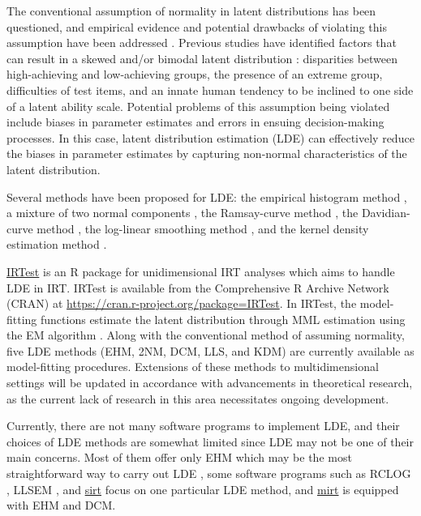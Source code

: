 The conventional assumption of normality in latent distributions has
been questioned, and empirical evidence and potential drawbacks of
violating this assumption have been addressed
\citep{Dudley-Marling:2020, Li:2022, Mislevy:1984, Sass+Schmitt+Walker:2008, Seong:1990, Woods+Lin:2009}.
Previous studies have identified factors that can result in a skewed
and/or bimodal latent distribution
\citep{Harvey+Murray:1994, Ho+Yu:2015, Woods:2015, Yadin:2013}:
disparities between high-achieving and low-achieving groups, the
presence of an extreme group, difficulties of test items, and an innate
human tendency to be inclined to one side of a latent ability scale.
Potential problems of this assumption being violated include biases in
parameter estimates and errors in ensuing decision-making processes. In
this case, latent distribution estimation (LDE) can effectively reduce
the biases in parameter estimates by capturing non-normal
characteristics of the latent distribution.

Several methods have been proposed for LDE: the empirical histogram
method \citep[EHM:][]{Bock+Aitkin:1981, Mislevy:1984}, a mixture of two normal
components \citep[2NM:][]{Li:2021, Mislevy:1984}, the Ramsay-curve method \citep[RCM:][]{Woods:2006}, the Davidian-curve method \citep[DCM:][]{Woods+Lin:2009}, the
log-linear smoothing method \citep[LLS:][]{Casabianca+Lewis:2015, Xu+vonDavier:2008}, and the kernel density
estimation method \citep[KDM:][]{Li:2022}.

\href{https://CRAN.R-project.org/package=IRTest}{IRTest} is an R package for
unidimensional IRT analyses which aims to handle LDE in IRT. IRTest is
available from the Comprehensive R Archive Network (CRAN) at
\url{https://cran.r-project.org/package=IRTest}. In IRTest, the
model-fitting functions estimate the latent distribution through MML
estimation using the EM algorithm \citep[MML-EM:][]{Bock+Aitkin:1981}. Along
with the conventional method of assuming normality, five LDE methods
(EHM, 2NM, DCM, LLS, and KDM) are currently available as model-fitting
procedures. Extensions of these methods to multidimensional settings
will be updated in accordance with advancements in theoretical research,
as the current lack of research in this area necessitates ongoing
development.

Currently, there are not many software programs to implement LDE, and
their choices of LDE methods are somewhat limited since LDE may not be
one of their main concerns. Most of them offer only EHM which may be the
most straightforward way to carry out LDE \citetext{\citealp[e.g., BILOG-MG,][]{BILOG-MG}; \citealp[flexMIRT,][]{flexMIRT}}, some software programs such as RCLOG
\citep{RCLOG}, LLSEM \citep{LLSEM}, and
\href{https://CRAN.R-project.org/package=sirt}{sirt} \citep{sirt} focus on one
particular LDE method, and
\href{https://CRAN.R-project.org/package=mirt}{mirt} \citep{mirt} is equipped with
EHM and DCM.

